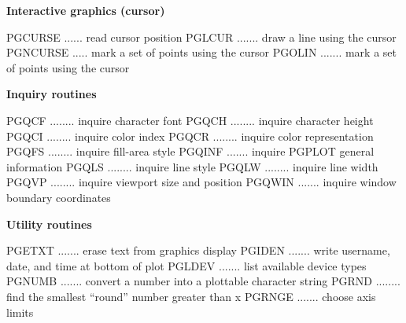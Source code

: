 \par\centerline{\bf Interactive graphics (cursor)}
{\eightpoint\begintt
PGCURSE ...... read cursor position
PGLCUR ....... draw a line using the cursor
PGNCURSE ..... mark a set of points using the cursor
PGOLIN ....... mark a set of points using the cursor
\endtt}

\par\centerline{\bf Inquiry routines}
{\eightpoint\begintt
PGQCF ........ inquire character font
PGQCH ........ inquire character height
PGQCI ........ inquire color index
PGQCR ........ inquire color representation
PGQFS ........ inquire fill-area style
\endtt}
{\eightpoint\begintt
PGQINF ....... inquire PGPLOT general information
PGQLS ........ inquire line style
PGQLW ........ inquire line width
PGQVP ........ inquire viewport size and position
PGQWIN ....... inquire window boundary coordinates
\endtt}

\par\centerline{\bf Utility routines}
{\eightpoint\begintt
PGETXT ....... erase text from graphics display
PGIDEN ....... write username, date, and time at bottom of plot
PGLDEV ....... list available device types
PGNUMB ....... convert a number into a plottable character string
PGRND ........ find the smallest ``round'' number greater than x
\endtt}
{\eightpoint\begintt
PGRNGE ....... choose axis limits
\endtt}
